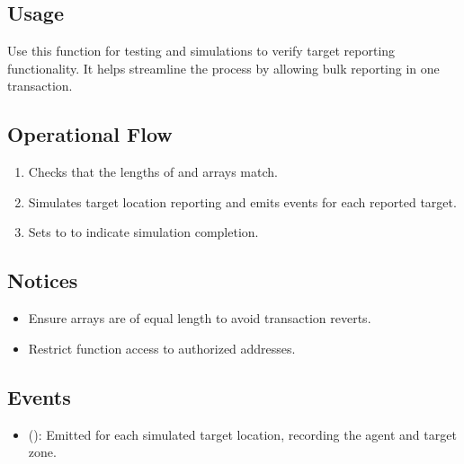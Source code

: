 \documentclass[a4paper,10pt,english]{sphinxmanual}
\begin{document}
\subsection{Usage}
\label{\detokenize{docs_consensus_mechanism_contract:id8}}
\sphinxAtStartPar
Use this function for testing and simulations to verify target reporting functionality. It helps streamline the process by allowing bulk reporting in one transaction.


\subsection{Operational Flow}
\label{\detokenize{docs_consensus_mechanism_contract:id9}}\begin{enumerate}
%
\item {} 
\sphinxAtStartPar
{} Checks that the lengths of  and  arrays match.

\item {} 
\sphinxAtStartPar
{} Simulates target location reporting and emits  events for each reported target.

\item {} 
\sphinxAtStartPar
{} Sets  to  to indicate simulation completion.

\end{enumerate}


\subsection{Notices}
\label{\detokenize{docs_consensus_mechanism_contract:notices}}\begin{itemize}
\item {} 
\sphinxAtStartPar
{} Ensure arrays are of equal length to avoid transaction reverts.

\item {} 
\sphinxAtStartPar
{} Restrict function access to authorized addresses.

\end{itemize}


\subsection{Events}
\label{\detokenize{docs_consensus_mechanism_contract:events}}\begin{itemize}
\item {} 
\sphinxAtStartPar
{} ():
Emitted for each simulated target location, recording the agent and target zone.

\end{itemize}
\end{document}
